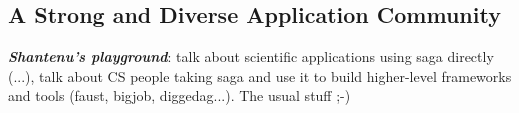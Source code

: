 \documentclass[a4paper,10pt]{article}
\newcommand{\BI}[1]{\textbf{\textit{#1}}}
\begin{document}
\subsection*{A Strong and Diverse Application Community}
\BI{Shantenu's playground}: talk about scientific applications using saga directly (...), talk about CS people taking saga and use it to build higher-level frameworks and tools (faust, bigjob, diggedag...). The usual stuff ;-)
 
 \pagebreak
  
 
\end{document}
